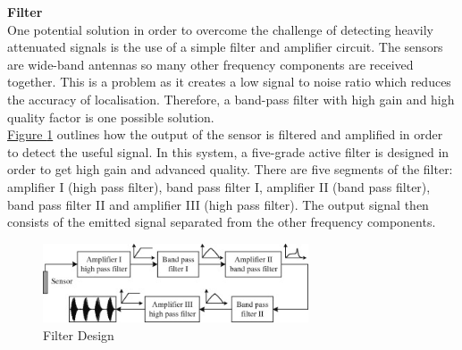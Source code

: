 \documentclass[11pt]{article}		%
\newcommand{\figref}[1]{\hyperref[#1]{Figure \ref*{#1}}}    %
\begin{document}
			\textbf{Filter}
			\\
	        One potential solution in order to overcome the challenge of detecting heavily attenuated signals is the use of a simple filter and amplifier circuit.
	        The sensors are wide-band antennas so many other frequency components are received together. This is a problem as it creates a low signal to noise ratio which reduces the accuracy of localisation.
	        Therefore, a band-pass filter with high gain and high quality factor is one possible solution.
	        \\
	        \hspace*{2ex}\figref{filterDesign} outlines how the output of the sensor is filtered and amplified in order to detect the useful signal. 
	        In this system, a five-grade active filter is designed in order to get high gain and advanced quality. There are five segments of the filter: amplifier I (high pass filter), band pass filter I, amplifier II (band pass filter), band pass filter II and amplifier III (high pass filter).
	        The output signal then consists of the emitted signal separated from the other frequency components. 
	        
	        \begin{figure}[h]
				\centering
				\includegraphics[width = 0.7\textwidth]{Filtering.jpg}
				\caption{Filter Design} %
				\label{filterDesign}
			\end{figure}
			
\end{document}
